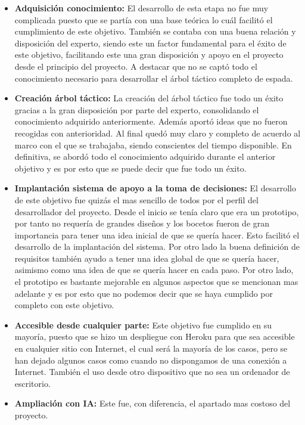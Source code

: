 \begin{itemize}
  \item \textbf{Adquisición conocimiento:} El desarrollo de esta etapa no fue muy complicada
    puesto que se partía con una base teórica lo cuál facilitó el cumplimiento de este objetivo.
    También se contaba con una buena relación y disposición del experto, siendo este un factor
    fundamental para el éxito de este objetivo, facilitando este una gran disposición y apoyo
    en el proyecto desde el principio del proyecto. A destacar que no se captó todo el conocimiento
    necesario para desarrollar el árbol táctico completo de espada.
  \item \textbf{Creación árbol táctico:} La creación del árbol táctico fue todo un éxito gracias
    a la gran disposición por parte del experto, consolidando el conocimiento adquirido anteriormente.
    Además aportó ideas que no fueron recogidas con anterioridad. Al final quedó muy claro y completo
    de acuerdo al marco con el que se trabajaba, siendo conscientes del tiempo disponible. En definitiva,
    se abordó todo el conocimiento adquirido durante el anterior objetivo y es por esto que se
    puede decir que fue todo un éxito.
  \item \textbf{Implantación sistema de apoyo a la toma de decisiones:} El desarrollo de este
    objetivo fue quizás el mas sencillo de todos por el perfil del desarrollador del proyecto.
    Desde el inicio se tenía claro que era un prototipo, por tanto no requería de grandes diseños
    y los bocetos fueron de gran importancia para tener una idea inicial de que se quería hacer.
    Esto facilitó el desarrollo de la implantación del sistema. Por otro lado la buena definición
    de requisitos también ayudo a tener una idea global de que se quería hacer, asimismo como
    una idea de que se quería hacer en cada paso. Por otro lado, el prototipo es bastante mejorable
    en algunos aspectos que se mencionan mas adelante y es por esto que no podemos decir que se
    haya cumplido por completo con este objetivo.
  \item \textbf{Accesible desde cualquier parte:} Este objetivo fue cumplido en su mayoría, puesto
    que se hizo un despliegue con Heroku para que sea accesible en cualquier sitio con Internet,
    el cual será la mayoría de los casos, pero se han dejado algunos casos como cuando no dispongamos
    de una conexión a Internet. También el uso desde otro dispositivo que no sea un ordenador de
    escritorio.
  \item \textbf{Ampliación con IA:} Este fue, con diferencia, el apartado mas costoso del proyecto.

\end{itemize}
